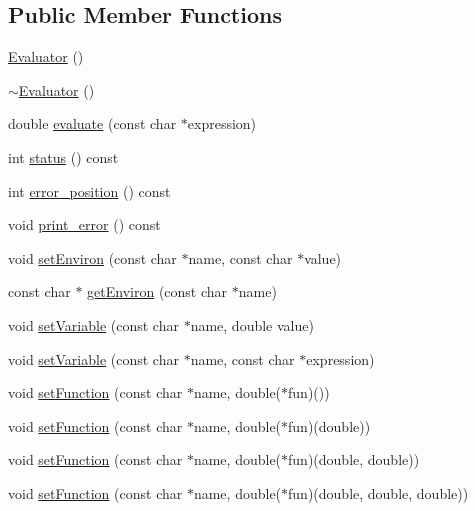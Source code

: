 \subsection*{Public Member Functions}
\begin{DoxyCompactItemize}
\item 
\hyperlink{class_xml_tools_1_1_evaluator_adcce935da40868c8e9ee41a6cd7da30c}{Evaluator} ()
\item 
\hyperlink{class_xml_tools_1_1_evaluator_acf06d5359f233c9e5c5d9127eb065f25}{$\sim$\+Evaluator} ()
\item 
double \hyperlink{class_xml_tools_1_1_evaluator_a602611e00d06e6fa2b8c5a1b292c2747}{evaluate} (const char $\ast$expression)
\item 
int \hyperlink{class_xml_tools_1_1_evaluator_af9265974643b0e1b1411ef5cea2b8580}{status} () const
\item 
int \hyperlink{class_xml_tools_1_1_evaluator_a2df5fb8050eeabce30ea87b8e211612a}{error\+\_\+position} () const
\item 
void \hyperlink{class_xml_tools_1_1_evaluator_a35b8445b51d7c045e4027aa55e1ddcae}{print\+\_\+error} () const
\item 
void \hyperlink{class_xml_tools_1_1_evaluator_a3329d0bef31237642ed7d5ca53d9d167}{set\+Environ} (const char $\ast$name, const char $\ast$value)
\item 
const char $\ast$ \hyperlink{class_xml_tools_1_1_evaluator_a3b19ba699533cdb3517c3929f9c479ae}{get\+Environ} (const char $\ast$name)
\item 
void \hyperlink{class_xml_tools_1_1_evaluator_a46b7fb4c5d1366cfa70a0b1faf1a8234}{set\+Variable} (const char $\ast$name, double value)
\item 
void \hyperlink{class_xml_tools_1_1_evaluator_aa585fa26afb0fbf64b60f9758a7de5f0}{set\+Variable} (const char $\ast$name, const char $\ast$expression)
\item 
void \hyperlink{class_xml_tools_1_1_evaluator_a54a432d7beccf23e2bebda5e449fffe0}{set\+Function} (const char $\ast$name, double($\ast$fun)())
\item 
void \hyperlink{class_xml_tools_1_1_evaluator_a2183927ba22512c28f9933439d88d6c7}{set\+Function} (const char $\ast$name, double($\ast$fun)(double))
\item 
void \hyperlink{class_xml_tools_1_1_evaluator_a831f5dc1635829ad2b09e79ada885771}{set\+Function} (const char $\ast$name, double($\ast$fun)(double, double))
\item 
void \hyperlink{class_xml_tools_1_1_evaluator_a40b7b86078c23765a6ab09636fece140}{set\+Function} (const char $\ast$name, double($\ast$fun)(double, double, double))

\end{DoxyCompactItemize}
